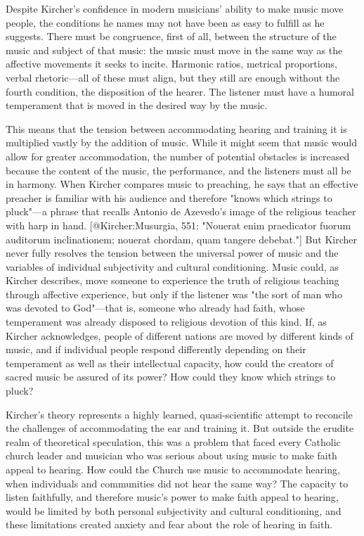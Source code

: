 Despite Kircher's confidence in modern musicians' ability to make music move
people, the conditions he names may not have been as easy to fulfill as he
suggests. 
There must be congruence, first of all, between the structure of the music and
subject of that music: the music must move in the same way as the affective
movements it seeks to incite. 
Harmonic ratios, metrical proportions, verbal rhetoric---all of these must
align, but they still are enough without the fourth condition, the disposition
of the hearer. 
The listener must have a humoral temperament that is moved in the desired way
by the music. 

This means that the tension between accommodating hearing and training it is
multiplied vastly by the addition of music. 
While it might seem that music would allow for greater accommodation, the number
of potential obstacles is increased because the content of the music, the
performance, and the listeners must all be in harmony. 
When Kircher compares music to preaching, he says that an effective preacher is
familiar with his audience and therefore "knows which strings to pluck"---a
phrase that recalls Antonio de Azevedo's image of the religious teacher with
harp in hand. 
[@Kircher:Musurgia, 551: 
"Nouerat enim praedicator fuorum auditorum inclinationem; nouerat chordam, quam
tangere debebat."]
But Kircher never fully resolves the tension between the universal power of
music and the variables of individual subjectivity and cultural conditioning. 
Music could, as Kircher describes, move someone to experience the truth of
religious teaching through affective experience, but only if the listener was
"the sort of man who was devoted to God"---that is, someone who already had
faith, whose temperament was already disposed to religious devotion of this
kind. 
If, as Kircher acknowledges, people of different nations are moved by different
kinds of music, and if individual people respond differently depending on their
temperament as well as their intellectual capacity, how could the creators of
sacred music be assured of its power?
How could they know which strings to pluck?

Kircher's theory represents a highly learned, quasi-scientific attempt to
reconcile the challenges of accommodating the ear and training it. 
But outside the erudite realm of theoretical speculation, this was a problem
that faced every Catholic church leader and musician who was serious about using
music to make faith appeal to hearing. 
How could the Church use music to accommodate hearing, when individuals and
communities did not hear the same way? 
The capacity to listen faithfully, and therefore music's power to make faith
appeal to hearing, would be limited by both personal subjectivity and cultural
conditioning, and these limitations created anxiety and fear about the role of
hearing in faith. 


